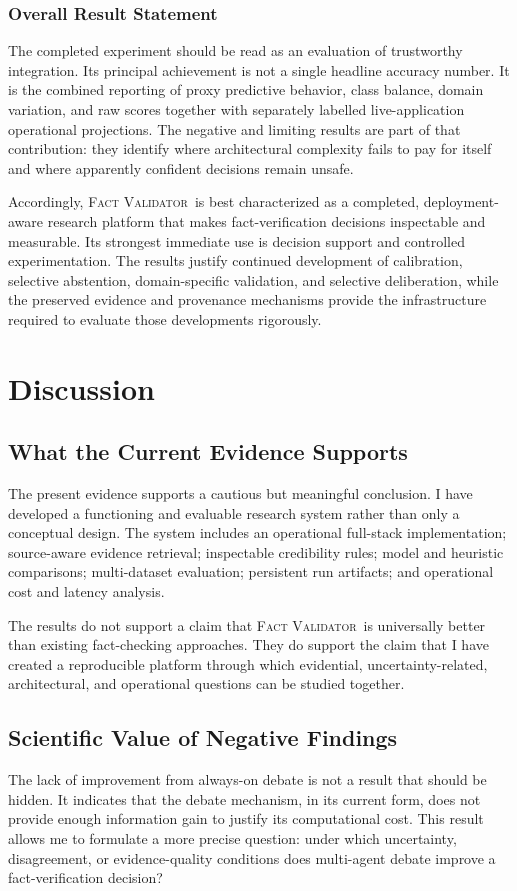\documentclass[12pt,a4paper,openany]{report}
\newcommand{\system}{\textsc{Fact Validator}}
\begin{document}
\subsection{Overall Result Statement}
The completed experiment should be read as an evaluation of trustworthy
integration. Its principal achievement is not a single headline accuracy
number. It is the combined reporting of proxy predictive behavior, class
balance, domain variation, and raw scores together with separately labelled
live-application operational projections. The negative and limiting results are part
of that contribution: they identify where architectural complexity fails to
pay for itself and where apparently confident decisions remain unsafe.

Accordingly, \system\ is best characterized as a completed, deployment-aware
research platform that makes fact-verification decisions inspectable and
measurable. Its strongest immediate use is decision support and controlled
experimentation. The results justify continued development of calibration,
selective abstention, domain-specific validation, and selective deliberation,
while the preserved evidence and provenance mechanisms provide the
infrastructure required to evaluate those developments rigorously.

\chapter{Discussion}
\section{What the Current Evidence Supports}
The present evidence supports a cautious but meaningful conclusion. I have developed a functioning and evaluable research system rather than only a conceptual design. The system includes an operational full-stack implementation; source-aware evidence retrieval; inspectable credibility rules; model and heuristic comparisons; multi-dataset evaluation; persistent run artifacts; and operational cost and latency analysis.

The results do not support a claim that \system\ is universally better than existing fact-checking approaches. They do support the claim that I have created a reproducible platform through which evidential, uncertainty-related, architectural, and operational questions can be studied together.

\section{Scientific Value of Negative Findings}
The lack of improvement from always-on debate is not a result that should be hidden. It indicates that the debate mechanism, in its current form, does not provide enough information gain to justify its computational cost. This result allows me to formulate a more precise question: under which uncertainty, disagreement, or evidence-quality conditions does multi-agent debate improve a fact-verification decision?
\end{document}
